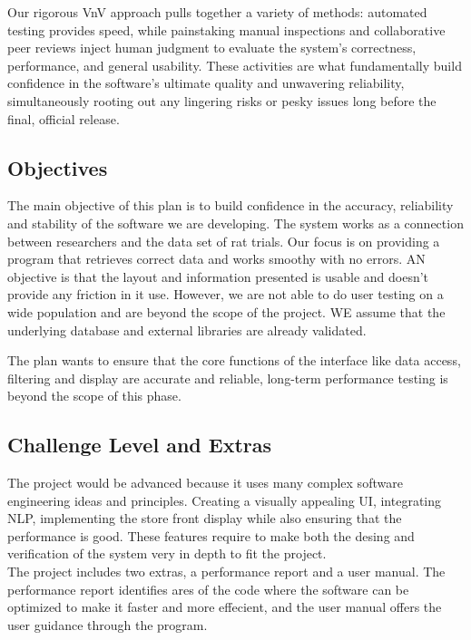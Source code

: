 \documentclass[12pt, titlepage]{article}
\begin{document}
Our rigorous VnV approach pulls together a variety of methods: automated testing provides speed, while painstaking manual
 inspections and collaborative peer reviews inject human judgment to evaluate the system's correctness, performance, and 
 general usability. These activities are what fundamentally build confidence in the software's ultimate quality and 
 unwavering reliability, simultaneously rooting out any lingering risks or pesky issues long before the final, official 
 release.


\subsection{Objectives}


   The main objective of this plan is to build confidence in the accuracy, reliability and stability of the software we 
   are developing. The system works as a connection between researchers and the data set of rat trials. Our focus is on providing 
   a program that retrieves correct data and works smoothy with no errors. AN objective is that the layout and information presented
   is usable and doesn't provide any friction in it use. However, we are not able to do user testing on a wide population and are 
   beyond the scope of the project. WE assume that the underlying database and external libraries are already validated.

The plan wants to ensure that the core functions of the interface like data access, filtering and display are
 accurate and reliable,  long-term performance testing is beyond the scope of 
 this phase.

\subsection{Challenge Level and Extras}

The project would be advanced because it uses many complex software engineering ideas and principles. Creating a visually appealing UI, integrating NLP, implementing the store front display while
also ensuring that the performance is good. These features require to make both the desing and verification of the system very in depth to fit the project.\\

The project includes two extras, a performance report and a user manual. The performance report identifies ares of the code where the software can be optimized to make it faster and more effecient, and the user manual
offers the user guidance through the program.
\end{document}
